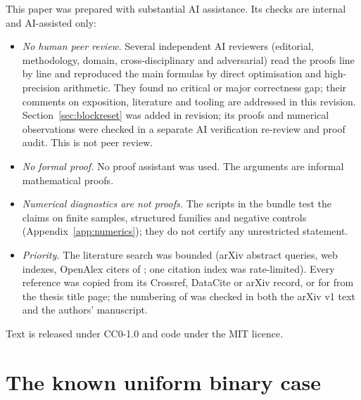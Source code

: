 \documentclass[11pt,a4paper]{article}
\numberwithin{equation}{section}
\theoremstyle{definition}
\theoremstyle{remark}
\begin{document}
\smallskip
\noindent This paper was prepared with substantial AI assistance. Its
checks are internal and AI-assisted only:
\begin{itemize}
\item \emph{No human peer review.} Several independent AI reviewers
(editorial, methodology, domain, cross-disciplinary and adversarial) read
the proofs line by line and reproduced the main formulas by direct
optimisation and high-precision arithmetic. They found no critical or
major correctness gap; their comments on exposition, literature and
tooling are addressed in this revision. Section~\ref{sec:blockreset} was
added in revision; its proofs and numerical observations were checked in a
separate AI verification re-review and proof audit. This is not peer
review.
\item \emph{No formal proof.} No proof assistant was used. The arguments
are informal mathematical proofs.
\item \emph{Numerical diagnostics are not proofs.} The scripts in the
bundle test the claims on finite samples, structured families and negative
controls (Appendix~\ref{app:numerics}); they do not certify any
unrestricted statement.
\item \emph{Priority.} The literature search was bounded (arXiv abstract
queries, web indexes, OpenAlex citers of \cite{caputo}; one citation index
was rate-limited). Every reference was copied from its Crossref, DataCite
or arXiv record, or for \cite{zhao} from the thesis title page; the
numbering of \cite{caputo} was checked in both the arXiv v1 text and the
authors' manuscript.
\end{itemize}
Text is released under CC0-1.0 and code under the MIT licence.

\appendix
\section{The known uniform binary case}\label{app:binary}
\end{document}
